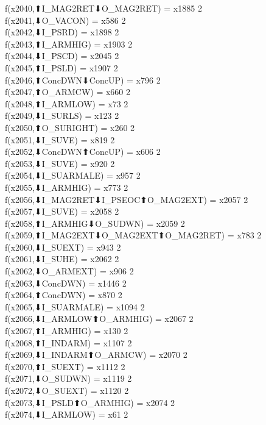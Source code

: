 f(x2040,⬆I_MAG2RET⬇O_MAG2RET) = x1885 {2} \\
f(x2041,⬇O_VACON) = x586 {2} \\
f(x2042,⬇I_PSRD) = x1898 {2} \\
f(x2043,⬆I_ARMHIG) = x1903 {2} \\
f(x2044,⬇I_PSCD) = x2045 {2} \\
f(x2045,⬆I_PSLD) = x1907 {2} \\
f(x2046,⬆ConcDWN⬇ConcUP) = x796 {2} \\
f(x2047,⬆O_ARMCW) = x660 {2} \\
f(x2048,⬆I_ARMLOW) = x73 {2} \\
f(x2049,⬇I_SURLS) = x123 {2} \\
f(x2050,⬆O_SURIGHT) = x260 {2} \\
f(x2051,⬇I_SUVE) = x819 {2} \\
f(x2052,⬇ConcDWN⬆ConcUP) = x606 {2} \\
f(x2053,⬇I_SUVE) = x920 {2} \\
f(x2054,⬇I_SUARMALE) = x957 {2} \\
f(x2055,⬇I_ARMHIG) = x773 {2} \\
f(x2056,⬇I_MAG2RET⬇I_PSEOC⬆O_MAG2EXT) = x2057 {2} \\
f(x2057,⬇I_SUVE) = x2058 {2} \\
f(x2058,⬆I_ARMHIG⬇O_SUDWN) = x2059 {2} \\
f(x2059,⬆I_MAG2EXT⬇O_MAG2EXT⬆O_MAG2RET) = x783 {2} \\
f(x2060,⬇I_SUEXT) = x943 {2} \\
f(x2061,⬇I_SUHE) = x2062 {2} \\
f(x2062,⬇O_ARMEXT) = x906 {2} \\
f(x2063,⬇ConcDWN) = x1446 {2} \\
f(x2064,⬆ConcDWN) = x870 {2} \\
f(x2065,⬇I_SUARMALE) = x1094 {2} \\
f(x2066,⬇I_ARMLOW⬆O_ARMHIG) = x2067 {2} \\
f(x2067,⬆I_ARMHIG) = x130 {2} \\
f(x2068,⬆I_INDARM) = x1107 {2} \\
f(x2069,⬇I_INDARM⬆O_ARMCW) = x2070 {2} \\
f(x2070,⬆I_SUEXT) = x1112 {2} \\
f(x2071,⬇O_SUDWN) = x1119 {2} \\
f(x2072,⬇O_SUEXT) = x1120 {2} \\
f(x2073,⬇I_PSLD⬆O_ARMHIG) = x2074 {2} \\
f(x2074,⬇I_ARMLOW) = x61 {2} \\
